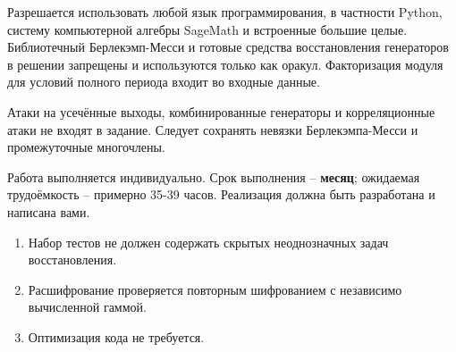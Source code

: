 \documentclass{ca-capstone}
\begin{document}
\details
Разрешается использовать любой язык программирования, в частности Python, систему 
компьютерной алгебры SageMath и встроенные большие целые. Библиотечный
Берлекэмп-Месси и готовые средства восстановления генераторов в решении запрещены и
используются только как оракул. Факторизация модуля для условий полного периода входит во
входные данные.

Атаки на усечённые выходы, комбинированные генераторы и корреляционные атаки не входят в
задание. Следует сохранять невязки Берлекэмпа-Месси и промежуточные многочлены.

\schedule
Работа выполняется индивидуально. Срок выполнения -- \textbf{месяц}; ожидаемая трудоёмкость
-- примерно 35-39 часов. Реализация должна быть разработана и написана вами.

\remarks
\begin{enumerate}
  \item Набор тестов не должен содержать скрытых неоднозначных задач восстановления.
  \item Расшифрование проверяется повторным шифрованием с независимо вычисленной гаммой.
  \item Оптимизация кода не требуется.
\end{enumerate}

\end{document}
